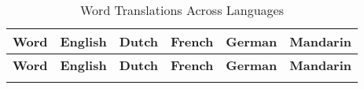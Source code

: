 \begin{longtable}{%
    >{\raggedright\arraybackslash}p{2.5cm} 
    >{\raggedright\arraybackslash}p{2.5cm} 
    >{\raggedright\arraybackslash}p{2.5cm} 
    >{\raggedright\arraybackslash}p{2.5cm} 
    >{\raggedright\arraybackslash}p{2.5cm} 
    >{\raggedright\arraybackslash}p{2cm}}
\caption{Word Translations Across Languages} \label{word-translations} \\ 
\toprule
\textbf{Word} & \textbf{English} & \textbf{Dutch} & \textbf{French} & \textbf{German} & \textbf{Mandarin} \\ 
\midrule
\endfirsthead

\toprule
\textbf{Word} & \textbf{English} & \textbf{Dutch} & \textbf{French} & \textbf{German} & \textbf{Mandarin} \\ 
\midrule
\endhead

\bottomrule
\endfoot    


\end{longtable}
